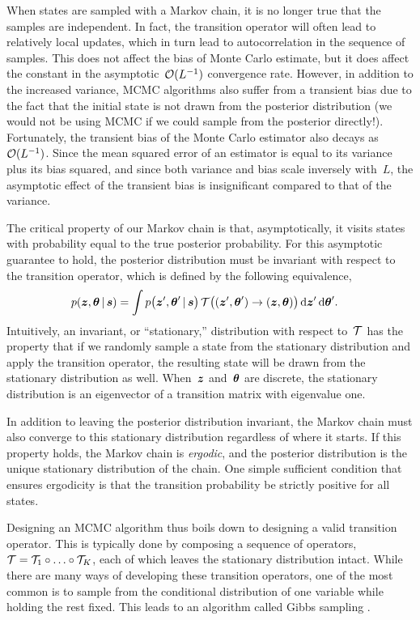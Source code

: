 When states are sampled with a Markov chain, it is no longer true that
the samples are independent. In fact, the transition operator will
often lead to relatively local updates, which in turn lead to autocorrelation
in the sequence of samples. This does not affect the bias of Monte
Carlo estimate, but it does affect the constant in the
asymptotic~$\mathcal{O}(L^{-1})$ convergence rate. However, in addition to 
the increased variance, MCMC algorithms also suffer from a transient 
bias due to the fact that the initial state is not drawn from the 
posterior distribution (we would 
not be using MCMC if we could sample from the posterior directly!). Fortunately, the transient bias 
of the Monte Carlo estimator also decays as~$\mathcal{O}(L^{-1})$. Since the 
mean squared error of an estimator is equal to its variance plus its 
 bias squared, and since both variance and bias scale inversely with~$L$, 
the asymptotic effect of the transient bias is insignificant compared to 
that of the variance. 

The critical property of our Markov chain is that, asymptotically, it
visits states with probability equal to the true posterior
probability.  For this asymptotic guarantee to hold, the posterior
distribution must be invariant with respect to the transition
operator, which is defined by the following equivalence,
\begin{align}
  \label{eq:invariance}
  p(\boldsymbol{z}, \boldsymbol{\theta} \,|\, \boldsymbol{s}) 
  &= \int  p \big(\boldsymbol{z}', \boldsymbol{\theta}' \,|\, \boldsymbol{s} \big) \,
    \mathcal{T} \big((\boldsymbol{z}', \boldsymbol{\theta}') \to (\boldsymbol{z}, \boldsymbol{\theta}) \big) \, 
    \mathrm{d}\boldsymbol{z}' \, \mathrm{d}\boldsymbol{\theta}'. 
\end{align}
Intuitively, an invariant, or ``stationary,'' distribution with
respect to~$\mathcal{T}$ has the property that if we randomly sample a state
from the stationary distribution and apply the transition operator,
the resulting state will be drawn from the stationary distribution as
well. When~$\boldsymbol{z}$ and~$\boldsymbol{\theta}$ are discrete, the stationary
distribution is an eigenvector of a transition matrix with eigenvalue
one.

In addition to leaving the posterior distribution invariant, the
Markov chain must also converge to this stationary distribution
regardless of where it starts. If this property holds, the Markov
chain is \emph{ergodic}, and the posterior distribution is the unique
stationary distribution of the chain. One simple sufficient condition
that ensures ergodicity is that the transition probability be strictly
positive for all states.

Designing an MCMC algorithm thus boils down to designing a valid
transition operator. This is typically done by composing a sequence of
operators,~${\mathcal{T} = \mathcal{T}_1 \circ \ldots \circ \mathcal{T}_K}$, each of which
leaves the stationary distribution intact. While there are many ways
of developing these transition operators, one of the most common 
is to sample from the conditional distribution of one variable 
while holding the rest fixed. This leads to an algorithm called 
Gibbs sampling \citep{geman1984stochastic}.

